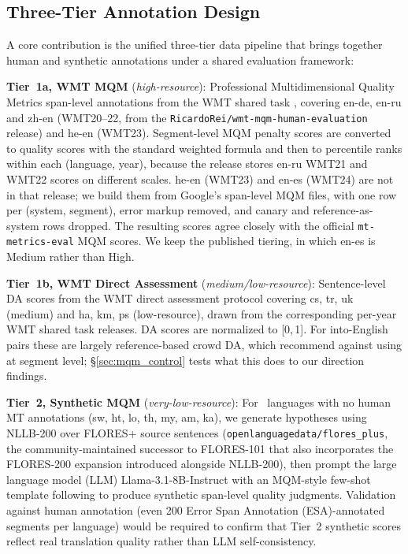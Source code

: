 \documentclass[11pt]{article}
\begin{document}
\subsection{Three-Tier Annotation Design}

A core contribution is the unified three-tier data pipeline that brings together human and synthetic annotations under a shared evaluation framework:

\textbf{Tier~1a, WMT MQM} (\textit{high-resource}): Professional Multidimensional Quality Metrics span-level annotations from the WMT shared task \cite{freitag2021experts}, covering en-de, en-ru and zh-en (WMT20--22, from the \texttt{RicardoRei/wmt-mqm-human-evaluation} release) and he-en (WMT23). Segment-level MQM penalty scores are converted to quality scores with the standard weighted formula and then to percentile ranks within each (language, year), because the release stores en-ru WMT21 and WMT22 scores on different scales. he-en (WMT23) and en-es (WMT24) are not in that release; we build them from Google's span-level MQM files, with one row per (system, segment), error markup removed, and canary and reference-as-system rows dropped. The resulting scores agree closely with the official \texttt{mt-metrics-eval} MQM scores. We keep the published tiering, in which en-es is Medium rather than High.

\textbf{Tier~1b, WMT Direct Assessment} (\textit{medium/low-resource}): Sentence-level DA scores from the WMT direct assessment protocol \cite{graham2017crowd} covering cs, tr, uk (medium) and ha, km, ps (low-resource), drawn from the corresponding per-year WMT shared task releases. DA scores are normalized to [0,\,1]. For into-English pairs these are largely reference-based crowd DA, which \citet{freitag2022results} recommend against using at segment level; \S\ref{sec:mqm_control} tests what this does to our direction findings.

\label{sec:tier2}\textbf{Tier~2, Synthetic MQM} (\textit{very-low-resource}): For \NumTierTwoLanguages\ languages with no human MT annotations (sw, ht, lo, th, my, am, ka), we generate hypotheses using NLLB-200 \cite{costa2022no} over FLORES+ \cite{goyal2022flores,costa2022no} source sentences (\texttt{openlanguagedata/flores\_plus}, the community-maintained successor to FLORES-101 that also incorporates the FLORES-200 expansion introduced alongside NLLB-200), then prompt the large language model (LLM) Llama-3.1-8B-Instruct \cite{dubey2024llama3} with an MQM-style few-shot template following \citet{kocmi2023gembamqm} to produce synthetic span-level quality judgments. Validation against human annotation (even 200 Error Span Annotation (ESA)-annotated segments per language) would be required to confirm that Tier~2 synthetic scores reflect real translation quality rather than LLM self-consistency.
\end{document}
